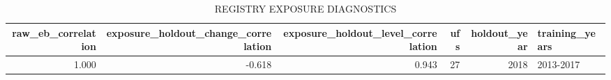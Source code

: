 \begin{table}[!htbp]
\centering
\begingroup\scriptsize
\begin{tabular}{rrrrrl}
  \hline
raw\_eb\_correlation & exposure\_holdout\_change\_correlation & exposure\_holdout\_level\_correlation & ufs & holdout\_year & training\_years \\ 
  \hline
1.000 & -0.618 & 0.943 &   27 & 2018 & 2013-2017 \\ 
   \hline
\end{tabular}
\endgroup
\caption{REGISTRY EXPOSURE DIAGNOSTICS} 
\label{tab:registry_exposure_diagnostics}
\end{table}
